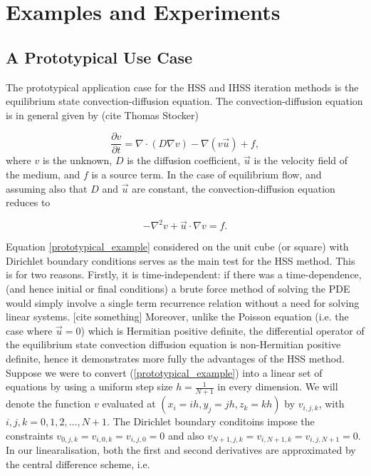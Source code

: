 \documentclass{article}
\begin{document}
\section{Examples and Experiments}
\subsection{A Prototypical Use Case}
The prototypical application case for the HSS and IHSS iteration methods is the equilibrium state convection-diffusion equation. \cite{bai2003hermitian, bai2005block, bai2010newton, HUANG2014142} The convection-diffusion equation is in general given by (cite Thomas Stocker)

\begin{equation}
    \frac{\partial v}{\partial t} = \nabla \cdot (D \nabla v) - \nabla(v\vec{u})+ f,
\end{equation}
where $v$ is the unknown, $D$ is the diffusion coefficient, $\vec{u}$ is the velocity field of the medium, and $f$ is a source term. In the case of equilibrium flow, and assuming also that $D$ and $\vec{u}$ are constant, the convection-diffusion equation reduces to

\begin{equation}\label{prototypical_example}
    -\nabla^2 v + \vec{u}\cdot \nabla v = f.
\end{equation}

Equation \ref{prototypical_example} considered on the unit cube (or square) with Dirichlet boundary conditions serves as the main test for the HSS method. This is for two reasons. Firstly, it is time-independent: if there was a time-dependence, (and hence initial or final conditions) a brute force method of solving the PDE would simply involve a single term recurrence relation without a need for solving linear systems. [cite something] Moreover, unlike the Poisson equation (i.e. the case where $\vec{u} = 0$) which is Hermitian positive definite, the differential operator of the equilibrium state convection diffusion equation is non-Hermitian positive definite, hence it demonstrates more fully the advantages of the HSS method. Suppose we were to convert (\ref{prototypical_example}) into a linear set of equations by using a uniform step size $h = \frac{1}{N+1}$ in every dimension. We will denote the function $v$ evaluated at $(x_i = ih, y_j = jh, z_k = kh)$ by $v_{i,j,k}$, with $i,j,k = 0, 1, 2,\ldots, N+1$. The Dirichlet boundary conditoins impose the constraints $v_{0,j,k} = v_{i,0,k} = v_{i,j,0} = 0$ and also $v_{N+1,j,k} = v_{i,N+1,k} = v_{i,j,N+1} =0$. In our linearalisation, both the first and second derivatives are approximated by the central difference scheme, i.e.
\end{document}
